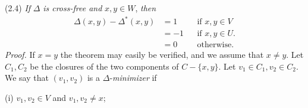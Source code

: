 \stmt
(2.4) \textit{If} $\Delta$ \textit{is cross-free and} $x, y \in W$, \textit{then}
\begin{align*}
\Delta(x, y) - \Delta^*(x, y) &= 1 &&\text{if } x, y \in V \\
&= -1 &&\text{if } x, y \in U. \\
&= 0 &&\text{otherwise.}
\end{align*}
\textit{Proof.} If $x = y$ the theorem may easily be verified, and we assume that $x \ne y$. Let $C_1, C_2$ be the closures of the two components of $C - \{x, y\}$. Let $v_1 \in C_1, v_2 \in C_2$. We say that $(v_1, v_2)$ is a $\Delta$-\textit{minimizer} if

\hspace*{12pt}(i) $v_1, v_2 \in V$ and $v_1, v_2 \ne x$;
